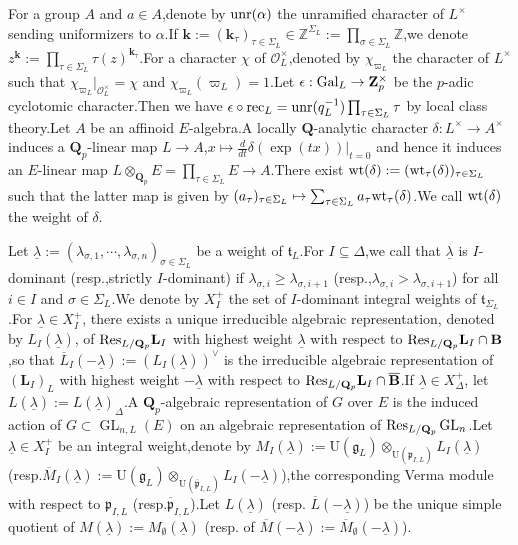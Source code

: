 \documentclass[10pt]{article}
\DeclareMathOperator{\GL}{GL}
\newcommand{\ccyc}{{\epsilon}}
\newcommand{\gal}{{\rm Gal}}
\newcommand{\ob}{{\overline{{\mathbf{B}}}}}
\newcommand{\unr}{{\rm unr}}
\newcommand{\rec}{{\rm rec}_L}
\newcommand{\wt}{{\rm wt}}
\newcommand{\res}{{\rm Res}}
\newcommand{\ul}{\underline}
\newcommand{\BZ}{{\mathbb{Z}}}
\newcommand{\bB}{{\mathbf{B}}}
\newcommand{\bL}{{\mathbf{L}}}
\newcommand{\bQ}{{\mathbf{Q}}}
\newcommand{\bZ}{{\mathbf{Z}}}
\newcommand{\bk}{{\mathbf{k}}}
\newcommand{\cO}{\mathcal O}
\newcommand{\fg}{{\mathfrak{g}}}
\newcommand{\fp}{{\mathfrak{p}}}
\newcommand{\ft}{{\mathfrak{t}}}
\begin{document}
For a group $A$ and $a\in A$,\;denote by $\unr(\alpha)$ the unramified character of $L^\times$ sending uniformizers to $\alpha$.\;If $\bk:=(\bk_{\tau})_{\tau\in \Sigma_L}\in \BZ^{\Sigma_L}:=\prod_{\sigma\in \Sigma_L}\BZ$,\;we denote $z^{\bk}:=\prod_{\tau\in  \Sigma_L}\tau(z)^{\bk_{\tau}}$.\;For a character $\chi$ of $\cO_L^{\times}$,\;denoted by $\chi_{\varpi_L}$ the character of $L^{\times}$ such that $\chi_{\varpi_L}|_{\cO_L^{\times}}=\chi$ and $\chi_{\varpi_L}(\varpi_L)=1$.\;Let ${\ccyc}:\gal_L\rightarrow \bZ_p^\times$ be the $p$-adic cyclotomic character.\;Then we have ${\ccyc}\circ\rec=\unr(q_L^{-1})\prod_{\tau\in \Sigma_L}\tau$ by local class theory.\;Let $A$ be an affinoid $E$-algebra.\;A locally $\bQ$-analytic character $\delta:L^\times\rightarrow A^\times$ induces a $\bQ_p$-linear map $L\rightarrow A$,\;$x\mapsto \frac{d}{dt}\delta(\exp(tx))|_{t=0}$ and hence it induces an $E$-linear map $L\otimes_{\bQ_p} E=\prod_{\tau\in \Sigma_L}E\rightarrow A$.\;There exist $\wt(\delta):=(\wt_{\tau}(\delta))_{\tau\in \Sigma_L}$ such that the latter map is given by $(a_{\tau})_{\tau\in \Sigma_L}\mapsto\sum_{\tau\in \Sigma_L}a_{\tau}\wt_{\tau}(\delta)$.\;We call $\wt(\delta)$ the weight of $\delta$.\;




Let $\ul{\lambda}:=(\lambda_{\sigma,1}, \cdots, \lambda_{\sigma,n})_{\sigma\in \Sigma_L}$ be a weight of $\ft_{L}$.\;For $I\subseteq \Delta$,\;we call that $\ul{\lambda}$ is $I$-dominant (resp.,\;strictly $I$-dominant)  if $\lambda_{\sigma,i}\geq \lambda_{\sigma,i+1}$ (resp.,\;$\lambda_{\sigma,i}> \lambda_{\sigma,i+1}$)   for all $i\in I$ and $\sigma\in \Sigma_L$.\;We denote by $X_{I}^+$ the set of $I$-dominant integral weights  of $\ft_{\Sigma_L}$.\;For $\ul{\lambda}\in X_{I}^+$, there exists a unique irreducible algebraic representation, denoted by $L_{I}(\ul{\lambda})$, of $\res_{L/
\bQ_p}\bL_{I}$ with highest weight $\ul{\lambda}$ with respect to $\res_{L/
\bQ_p}\bL_{I}\cap \bB$,\;so that $\overline{L}_{I}(-\ul{\lambda}):=(L_{I}(\ul{\lambda}))^\vee$ is the irreducible algebraic representation of $(\bL_{I})_{L}$ with highest weight $-\ul{\lambda}$ with respect to $\res_{L/
\bQ_p}\bL_{I}\cap \ob$.\;If $\ul{\lambda}\in X_{\Delta}^+$, let $L(\ul{\lambda}):=L(\ul{\lambda})_{\Delta}$.\;A $\bQ_p$-algebraic representation of $G$ over $E$ is the induced action of $G\subset \GL_{n,L}(E)$ on an algebraic representation of $\res_{L/
\bQ_p}\GL_{n}$.\;Let $\ul{\lambda}\in X_I^+$ be an integral weight,\;denote by $M_I(\ul{\lambda}):=\text{U}(\fg_{L})\otimes_{\text{U}(\fp_{I,L})} L_{I}(\ul{\lambda})$ (resp.\;$\overline{M}_I(\ul{\lambda}):=\text{U}(\fg_{L})\otimes_{\text{U}(\overline{\fp}_{I,L})}L_{I}(-\ul{\lambda})$),\;the corresponding Verma module with respect to $\fp_{I,L}$ (resp.\;$\overline{\fp}_{I,L}$).\;Let $L(\ul{\lambda})$ (resp. $\overline{L}(-\ul{\lambda})$) be the unique simple quotient of $M(\ul{\lambda}):=M_{\emptyset}(\ul{\lambda})$ (resp. of $\overline{M}(-\ul{\lambda}):=\overline{M}_{\emptyset}(-\ul{\lambda})$).\;
\end{document}
